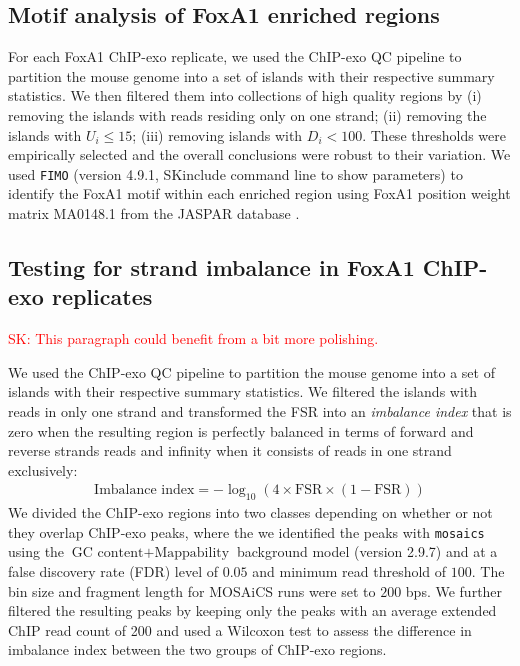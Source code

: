 \documentclass{bmcart}
\newcommand{\SK}[1]{\textcolor{red}{SK: #1}}
\begin{document}
\subsection*{Motif analysis of FoxA1 enriched regions}
For each FoxA1 ChIP-exo replicate, we used the ChIP-exo QC pipeline to partition the
mouse genome into a set of islands  with their respective summary
statistics. We  then filtered them into collections of high quality regions
by (i) removing the islands with reads residing only on one strand; (ii) removing the islands with $U_i \le 15$; (iii) removing islands with $D_i < 100$. These thresholds were empirically selected and the overall conclusions were robust to their variation.
We used \texttt{FIMO} (version 4.9.1, SK{include command line to show parameters}) \cite{fimo} to identify
the FoxA1 motif within each enriched region using FoxA1 position weight matrix MA0148.1 from the JASPAR database \cite{jaspar}.


\subsection*{Testing for strand imbalance in FoxA1 ChIP-exo replicates}
\SK{ This paragraph could benefit from a bit more polishing.}

We used the ChIP-exo QC pipeline to partition the
mouse genome into a set of islands with their respective summary
statistics. We filtered the islands with reads in only one strand and
 transformed the FSR into an \emph{imbalance index} that is zero
when the resulting region is perfectly balanced in terms of forward and reverse strands reads and infinity when it consists of
reads in one strand exclusively:
\begin{align*}
  \mbox{Imbalance index} = -\log_{10} (4 \times \mbox{FSR} \times (1 -
  \mbox{FSR}))
\end{align*}
We divided the ChIP-exo regions into two classes depending on 
whether or not they overlap  ChIP-exo peaks, where the we identified the peaks with \texttt{mosaics}
using the  $\mbox{GC content} + \mbox{Mappability}$ background model \cite{mosaics} (version 2.9.7) and at a false discovery rate (FDR) level of $0.05$ and minimum read threshold of $100$. 
The  bin size and fragment length for MOSAiCS runs were set to $200$ bps. 
We further filtered the resulting peaks by
keeping only the peaks with an average extended ChIP read count of 200 and  used a Wilcoxon test to assess the difference in imbalance index between the two groups of ChIP-exo regions.
\end{document}
